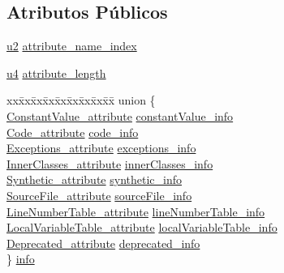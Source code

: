 \subsection*{Atributos Públicos}
\begin{DoxyCompactItemize}
\item 
\hyperlink{BasicTypes_8h_a732cde1300aafb73b0ea6c2558a7a54f}{u2} \hyperlink{structattribute__info_a19df9d4b42eb55ca5dc1bed98df89378}{attribute\+\_\+name\+\_\+index}
\item 
\hyperlink{BasicTypes_8h_ae5be1f726785414dd1b77d60df074c9d}{u4} \hyperlink{structattribute__info_a1ed8f679458c4bb0ed3315721588f50d}{attribute\+\_\+length}
\item 
\begin{tabbing}
xx\=xx\=xx\=xx\=xx\=xx\=xx\=xx\=xx\=\kill
union \{\\
\>\hyperlink{structConstantValue__attribute}{ConstantValue\_attribute} \hyperlink{structattribute__info_ae07b4986ad567ee03d7f5b9476cd2576}{constantValue\_info}\\
\>\hyperlink{structCode__attribute}{Code\_attribute} \hyperlink{structattribute__info_a098a24d1810b1a2a1691cbf89199bdc5}{code\_info}\\
\>\hyperlink{structExceptions__attribute}{Exceptions\_attribute} \hyperlink{structattribute__info_a244c271949354ebd402f9330cb02b062}{exceptions\_info}\\
\>\hyperlink{structInnerClasses__attribute}{InnerClasses\_attribute} \hyperlink{structattribute__info_ab17c5c178068ef13e7f6d61e741bc398}{innerClasses\_info}\\
\>\hyperlink{structSynthetic__attribute}{Synthetic\_attribute} \hyperlink{structattribute__info_a8a7080734144a95a2b2a0fc350fd235c}{synthetic\_info}\\
\>\hyperlink{structSourceFile__attribute}{SourceFile\_attribute} \hyperlink{structattribute__info_a92dad0fdd4730da884a5ee0f2fc181e7}{sourceFile\_info}\\
\>\hyperlink{structLineNumberTable__attribute}{LineNumberTable\_attribute} \hyperlink{structattribute__info_a184f00b0276336a22f3a41e55df6ecf9}{lineNumberTable\_info}\\
\>\hyperlink{structLocalVariableTable__attribute}{LocalVariableTable\_attribute} \hyperlink{structattribute__info_a98095c1c653f2dd7e6f11330967829e8}{localVariableTable\_info}\\
\>\hyperlink{structDeprecated__attribute}{Deprecated\_attribute} \hyperlink{structattribute__info_a915a26115aeeff5e3d997116f3d671ba}{deprecated\_info}\\
\} \hyperlink{structattribute__info_a5ce6e5e84e84941dfa2bab1322be6dcf}{info}\\

\end{tabbing}\end{DoxyCompactItemize}


